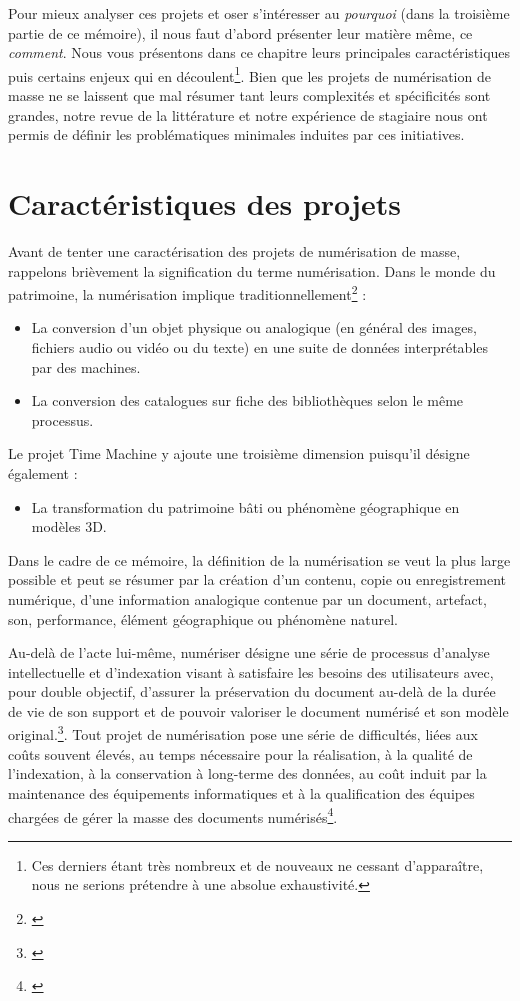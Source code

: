 Pour mieux analyser ces projets et oser s'intéresser au \textit{pourquoi} (dans la troisième partie de ce mémoire), il nous faut d'abord présenter leur matière même, ce \textit{comment}. Nous vous présentons dans ce chapitre leurs principales caractéristiques puis certains enjeux qui en découlent\footnote{Ces derniers étant très nombreux et de nouveaux ne cessant d'apparaître, nous ne serions prétendre à une absolue exhaustivité.}. Bien que les projets de numérisation de masse ne se laissent que mal résumer tant leurs complexités et spécificités sont grandes, notre revue de la littérature et notre expérience de stagiaire nous ont permis de définir les problématiques minimales induites par ces initiatives. 

\section{Caractéristiques des projets}\label{caracteristique}

Avant de tenter une caractérisation des projets de numérisation de masse, rappelons brièvement la signification du terme numérisation. Dans le monde du patrimoine, la numérisation implique traditionnellement\footnote{\cite[p.37]{dufrene_numerisation_2013}} : 

\begin{itemize}
\item La conversion d'un objet physique ou analogique (en général des images, fichiers audio ou vidéo ou du texte) en une suite de données interprétables par des machines.
\item La conversion des catalogues sur fiche des bibliothèques selon le même processus.
\end{itemize}

Le projet Time Machine y ajoute une troisième dimension puisqu'il désigne également : 
\begin{itemize}
\item La transformation du patrimoine bâti ou phénomène géographique en modèles 3D.
\end{itemize}

Dans le cadre de ce mémoire, la définition de la numérisation se veut la plus large possible et peut se résumer par la création d'un contenu, copie ou enregistrement numérique, d'une information analogique contenue par un document, artefact, son, performance, élément géographique ou phénomène naturel.

Au-delà de l'acte lui-même, numériser désigne une série de processus d'analyse intellectuelle et d'indexation visant à satisfaire les besoins des utilisateurs avec, pour double objectif, d'assurer la préservation du document au-delà de la durée de vie de son support et de pouvoir valoriser le document numérisé et son modèle original.\footnote{\cite{noauthor_numerisation_2013}}. Tout projet de numérisation pose une série de difficultés, liées aux coûts souvent élevés, au temps nécessaire pour la réalisation, à la qualité de l'indexation, à la conservation à long-terme des données, au coût induit par la maintenance des équipements informatiques et à la qualification des équipes chargées de gérer la masse des documents numérisés\footnote{\cite[p.37]{dufrene_numerisation_2013}}. 

